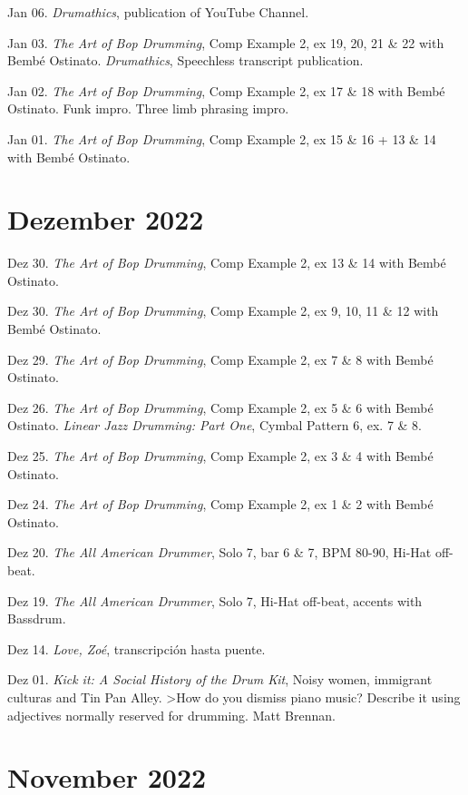 \documentclass[
]{book}
\begin{document}
Jan 06. \emph{Drumathics}, publication of YouTube Channel.

Jan 03. \emph{The Art of Bop Drumming}, Comp Example 2, ex 19, 20, 21 \& 22 with Bembé Ostinato. \emph{Drumathics}, Speechless transcript publication.

Jan 02. \emph{The Art of Bop Drumming}, Comp Example 2, ex 17 \& 18 with Bembé Ostinato. Funk impro. Three limb phrasing impro.

Jan 01. \emph{The Art of Bop Drumming}, Comp Example 2, ex 15 \& 16 + 13 \& 14 with Bembé Ostinato.

\hypertarget{dezember-2022}{%
\section*{Dezember 2022}\label{dezember-2022}}

Dez 30. \emph{The Art of Bop Drumming}, Comp Example 2, ex 13 \& 14 with Bembé Ostinato.

Dez 30. \emph{The Art of Bop Drumming}, Comp Example 2, ex 9, 10, 11 \& 12 with Bembé Ostinato.

Dez 29. \emph{The Art of Bop Drumming}, Comp Example 2, ex 7 \& 8 with Bembé Ostinato.

Dez 26. \emph{The Art of Bop Drumming}, Comp Example 2, ex 5 \& 6 with Bembé Ostinato. \emph{Linear Jazz Drumming: Part One}, Cymbal Pattern 6, ex. 7 \& 8.

Dez 25. \emph{The Art of Bop Drumming}, Comp Example 2, ex 3 \& 4 with Bembé Ostinato.

Dez 24. \emph{The Art of Bop Drumming}, Comp Example 2, ex 1 \& 2 with Bembé Ostinato.

Dez 20. \emph{The All American Drummer}, Solo 7, bar 6 \& 7, BPM 80-90, Hi-Hat off-beat.

Dez 19. \emph{The All American Drummer}, Solo 7, Hi-Hat off-beat, accents with Bassdrum.

Dez 14. \emph{Love, Zoé}, transcripción hasta puente.

Dez 01. \emph{Kick it: A Social History of the Drum Kit}, Noisy women, immigrant culturas and Tin Pan Alley.
\textgreater How do you dismiss piano music? Describe it using adjectives normally reserved for drumming. Matt Brennan.

\hypertarget{november-2022}{%
\section*{November 2022}\label{november-2022}}
\end{document}
